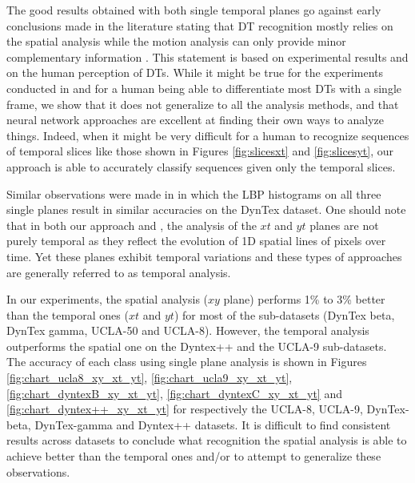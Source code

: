 \documentclass[a4paper,11pt]{article}
\begin{document}
The good results obtained with both single temporal planes go against early conclusions made in the literature stating that DT recognition mostly relies on the spatial analysis while the motion analysis can only provide minor complementary information \cite{ghanem2010maximum,ren2013dynamic,andrearczyk2015dynamic}.
This statement is based on experimental results and on the human perception of DTs.
While it might be true for the experiments conducted in \cite{ghanem2010maximum,ren2013dynamic,andrearczyk2015dynamic} and for a human being able to differentiate most DTs with a single frame,
we show that it does not generalize to all the analysis methods, and that neural network approaches are excellent at finding their own ways to analyze things.
Indeed, when it might be very difficult for a human to recognize sequences of temporal slices like those shown in Figures \ref{fig:slicesxt} and \ref{fig:slicesyt}, our approach is able to accurately classify sequences given only the temporal slices. 

Similar observations were made in \cite{zhao2007dynamic} in which the LBP histograms on all three single planes result in similar accuracies on the DynTex dataset.
One should note that in both our approach and \cite{zhao2007dynamic}, the analysis of the $xt$ and $yt$ planes are not purely temporal as they reflect the evolution of 1D spatial lines of pixels over time.
Yet these planes exhibit temporal variations and these types of approaches are generally referred to as temporal analysis.

In our experiments, the spatial analysis ($xy$ plane) performs 1\% to 3\% better than the temporal ones ($xt$ and $yt$) for most of the sub-datasets (DynTex beta, DynTex gamma, UCLA-50 and UCLA-8).
However, the temporal analysis outperforms the spatial one on the Dyntex++ and the UCLA-9 sub-datasets.
The accuracy of each class using single plane analysis is shown in Figures \ref{fig:chart_ucla8_xy_xt_yt}, \ref{fig:chart_ucla9_xy_xt_yt}, \ref{fig:chart_dyntexB_xy_xt_yt}, \ref{fig:chart_dyntexC_xy_xt_yt} and \ref{fig:chart_dyntex++_xy_xt_yt} for respectively the UCLA-8, UCLA-9, DynTex-beta, DynTex-gamma and Dyntex++ datasets.
It is difficult to find consistent results across datasets to conclude what recognition the spatial analysis is able to achieve better than the temporal ones and/or to attempt to generalize these observations.
\end{document}
